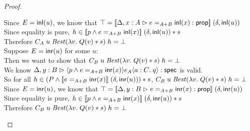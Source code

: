 \begin{proof}
\begin{tabbedproof}
\ooooo Since $E=\inl(u)$, we know that $\top = \interp{\judgeA[\Delta,x:A]{e=_{A+B}\inl(x)}{\assert}}\;(\delta,\inl(u))$\\
\ooooo Since equality is pure, $h \in \interp{p \land e =_{A+B} \inl(x)}\;(\delta,\inl(u)) * s$ \\
\ooooo Therefore $C_A\;u\;\mathit{Best}(\semfun{v}{Q(v)*s})\;h = \bot$\\
\oooo Suppose $E = \inr(u)$ for some $u$:  \\
\ooooo Then we want to show that $C_B\;u\;\mathit{Best}(\semfun{v}{Q(v)*s})\;h = \bot$\\
\ooooo We know $\judgeS[\Delta,y:B]{\mspec{p \land e =_{A+B} \inr(x)}{e_A}{a:C}{q}}$ is valid. \\
\ooooo So for all $h \in (P \land \interp{e =_{A+B} \inr(x)}\;(\delta,\inr(u))) * s$, $C_B\;u\;\mathit{Best}(\semfun{v}{Q(v)*s})\;h = \bot$\\
\ooooo Since $E=\inr(u)$, we know that $\top = \interp{\judgeA[\Delta,y:B]{e=_{A+B}\inr(x)}{\assert}}\;(\delta,\inr(u))$\\
\ooooo Since equality is pure, $h \in \interp{p \land e =_{A+B} \inr(x)}\;(\delta,\inr(u)) * s$ \\
\ooooo Therefore $C_B\;u\;\mathit{Best}(\semfun{v}{Q(v)*s})\;h = \bot$\\

\end{tabbedproof}
\end{proof}

